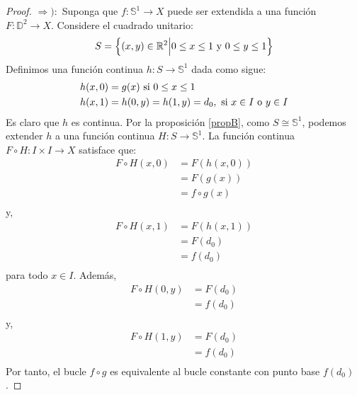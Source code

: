 \documentclass{article}
\newcounter{it}
\theoremstyle{largebreak}
\newcommand\cf[3]{\ensuremath{#1:#2\rightarrow#3}}
\begin{document}
    \begin{proof}
        $\Rightarrow):$ Suponga que $\cf{f}{\mathbb{S}^1}{X}$ puede ser extendida a una función $\cf{F}{\mathbb{D}^2}{X}$. Considere el cuadrado unitario:
        \begin{equation*}
            S=\left\{ (x,y)\in\mathbb{R}^2\Big|0\leq x\leq 1\textup{ y }0\leq y\leq 1 \right\}
        \end{equation*}
        Definimos una función continua $\cf{h}{S}{\mathbb{S}^1}$ dada como sigue:
        \begin{equation*}
            \begin{split}
                h(x,0) &= g(x) \textup{ si } 0\leq x\leq 1\\
                h(x,1) &= h(0,y)=h(1,y)=d_0,\textup{ si }x\in I\textup{ o }y\in I \\
            \end{split}
        \end{equation*}
        Es claro que $h$ es continua. Por la proposición \ref{propB}, como $S\cong\mathbb{S}^1$, podemos extender $h$ a una función continua $\cf{H}{S}{\mathbb{S}^1}$. La función continua $\cf{F\circ H}{I\times I}{X}$ satisface que:
        \begin{equation*}
            \begin{split}
                F\circ H(x,0) &= F(h(x,0))\\
                &= F(g(x))\\
                &= f\circ g(x)\\
            \end{split}
        \end{equation*}
        y,
        \begin{equation*}
            \begin{split}
                F\circ H(x,1) &= F(h(x,1))\\
                &= F(d_0)\\
                &= f(d_0)\\
            \end{split}
        \end{equation*}
        para todo $x\in I$. Además,
        \begin{equation*}
            \begin{split}
                F\circ H(0,y) &= F(d_0) \\
                &= f(d_0)\\
            \end{split}
        \end{equation*}
        y,
        \begin{equation*}
            \begin{split}
                F\circ H(1,y) &= F(d_0) \\
                &= f(d_0)\\
            \end{split}
        \end{equation*}
        Por tanto, el bucle $f\circ g$ es equivalente al bucle constante con punto base $f(d_0)$.


\end{proof}
\end{document}
